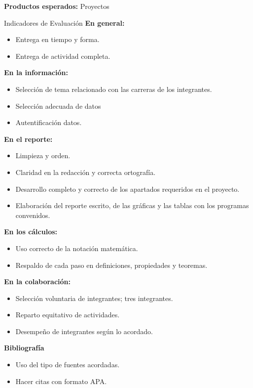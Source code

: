 \documentclass[11pt]{article}
\begin{document}
\begin{tcolorbox}
	\textbf{Productos esperados:}
	Proyectos
	
	\begin{mybox}{Indicadores de Evaluación}
		\textbf{En general:}
		\begin{itemize}
			\setlength{\itemsep}{0pt}
			\setlength{\parskip}{0pt}
			\item Entrega en tiempo y forma.
			\item Entrega de actividad completa.
		\end{itemize}
		\textbf{En la información:}
		\begin{itemize}
			\setlength{\itemsep}{0pt}
			\setlength{\parskip}{0pt}
			\item Selección de tema relacionado con las carreras de los integrantes.
			\item Selección adecuada de datos
			\item Autentificación datos.
		\end{itemize}
		\textbf{En el reporte:}
		\begin{itemize}
			\setlength{\itemsep}{0pt}
			\setlength{\parskip}{0pt}
			\item Limpieza y orden.
			\item Claridad en la redacción y correcta ortografía.
			\item Desarrollo completo y correcto de los apartados requeridos en el proyecto.
			\item Elaboración del reporte escrito, de las gráficas y las tablas con los programas convenidos.
		\end{itemize}
		\textbf{En los cálculos:}
		\begin{itemize}
			\setlength{\itemsep}{0pt}
			\setlength{\parskip}{0pt}
			\item Uso correcto de la notación matemática.
			\item Respaldo de cada paso en definiciones, propiedades y teoremas.
		\end{itemize}
		\textbf{En la colaboración:}
		\begin{itemize}
			\setlength{\itemsep}{0pt}
			\setlength{\parskip}{0pt}
			\item Selección voluntaria de integrantes; tres integrantes.
			\item Reparto equitativo de actividades.
			\item Desempeño de integrantes según lo acordado.
		\end{itemize}
		\textbf{Bibliografía}
		\begin{itemize}
			\setlength{\itemsep}{0pt}
			\setlength{\parskip}{0pt}
			\item Uso del tipo de fuentes acordadas.
			\item Hacer citas con formato APA.
		\end{itemize}
	\end{mybox}
\end{tcolorbox}
\end{document}
